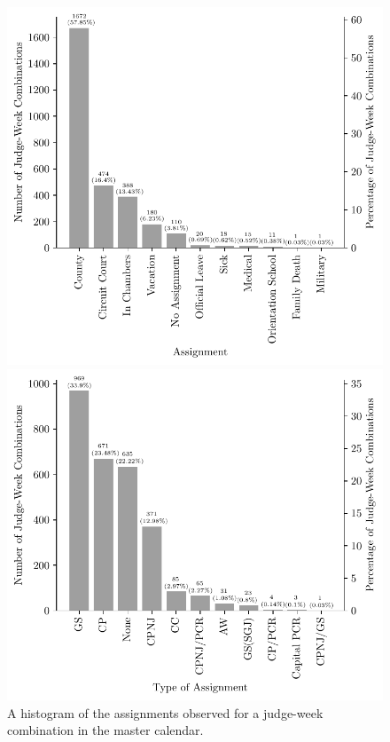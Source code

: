 \documentclass[11pt, oneside]{article}   	%
\theoremstyle{ModifiedStyle}
\begin{document}
			\begin{figure}[H]
				\centering
				\hspace*{-8mm}
				\begin{minipage}{.45\textwidth}
					\centering
					\hspace*{-10mm}
					\includegraphics[scale=0.67]{Figures/Type_of_Assignment_Histogram}
					\vspace*{-7mm}
					\caption{A histogram of the assignments observed for a judge-week combination in the master calendar.}
					\label{Figure_Assignment_Histogram}
				\end{minipage}
				\hspace{5mm}
				\begin{minipage}{0.45\textwidth}
					\centering
					\vspace*{0mm}
					\includegraphics[scale=0.67]{Figures/Type_of_Court_Assignment_Histogram}

\end{minipage}
\end{figure}
\end{document}
